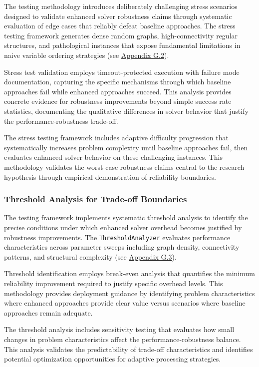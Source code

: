 The testing methodology introduces deliberately challenging stress scenarios designed to validate enhanced solver robustness claims through systematic evaluation of edge cases that reliably defeat baseline approaches. The stress testing framework generates dense random graphs, high-connectivity regular structures, and pathological instances that expose fundamental limitations in naive variable ordering strategies (see \hyperref[appendix:stress-testing]{Appendix G.2}).

Stress test validation employs timeout-protected execution with failure mode documentation, capturing the specific mechanisms through which baseline approaches fail while enhanced approaches succeed. This analysis provides concrete evidence for robustness improvements beyond simple success rate statistics, documenting the qualitative differences in solver behavior that justify the performance-robustness trade-off.

The stress testing framework includes adaptive difficulty progression that systematically increases problem complexity until baseline approaches fail, then evaluates enhanced solver behavior on these challenging instances. This methodology validates the worst-case robustness claims central to the research hypothesis through empirical demonstration of reliability boundaries.

\subsubsection{Threshold Analysis for Trade-off Boundaries}
\label{sec:threshold-analysis}

The testing framework implements systematic threshold analysis to identify the precise conditions under which enhanced solver overhead becomes justified by robustness improvements. The \texttt{ThresholdAnalyzer} evaluates performance characteristics across parameter sweeps including graph density, connectivity patterns, and structural complexity (see \hyperref[appendix:threshold-analysis]{Appendix G.3}).

Threshold identification employs break-even analysis that quantifies the minimum reliability improvement required to justify specific overhead levels. This methodology provides deployment guidance by identifying problem characteristics where enhanced approaches provide clear value versus scenarios where baseline approaches remain adequate.

The threshold analysis includes sensitivity testing that evaluates how small changes in problem characteristics affect the performance-robustness balance. This analysis validates the predictability of trade-off characteristics and identifies potential optimization opportunities for adaptive processing strategies.


